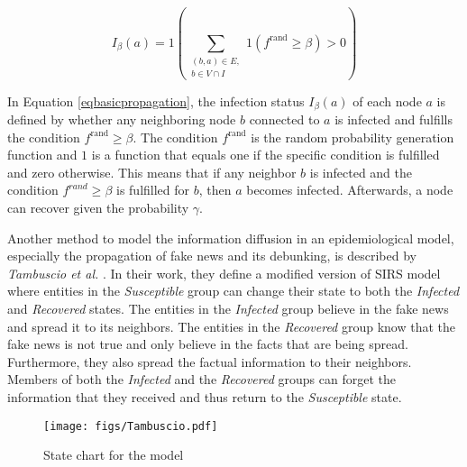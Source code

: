 \begin{equation}
    I_\beta(a) = 1 \left (\sum\limits_{\substack{(b,a)\in E, \\ b \in V \cap I}}
    1(f^{\mathrm{rand}}\geq \beta)>0 \right ) 
    \label{eqbasicpropagation}
\end{equation}

In Equation \ref{eqbasicpropagation}, the infection status $I_\beta(a)$ of each node $a$ is defined 
by whether any neighboring node $b$ connected to $a$ is infected 
and fulfills the condition $f^{\mathrm{rand}}\geq \beta$.
The condition $f^{\mathrm{rand}}$ is the random probability generation function and $1$ 
is a function that equals one if the specific condition is fulfilled and 
zero otherwise. This means that if any neighbor $b$ is infected and the 
condition $f^{rand}\geq \beta$ is fulfilled for $b$, then $a$ becomes infected. 
Afterwards, a node can recover given the probability $\gamma$.

Another method to model the information diffusion in an epidemiological model, 
especially the propagation of fake news and its debunking,
is described by \textit{Tambuscio et al.} \cite{sirsmodel}. In their work, they
define a modified version of SIRS model where entities in the \textit{Susceptible}
group can change their state to both the \textit{Infected} and
\textit{Recovered} states.
The entities in the \textit{Infected} group believe in the fake news and spread it 
to its neighbors.
The entities in the \textit{Recovered} group know that the fake news is not 
true and only believe in the facts that are being spread. Furthermore, they
also spread the factual information to their neighbors.
Members of both the \textit{Infected} and the \textit{Recovered} groups 
can forget the information that they received 
and thus return to the \textit{Susceptible} state.

\begin{figure}[!ht]
    \center
    \texttt{[image: figs/Tambuscio.pdf]}
    \caption{State chart for the model \cite{sirsmodel}}
    \label{originalmodelstatechart}
\end{figure}

